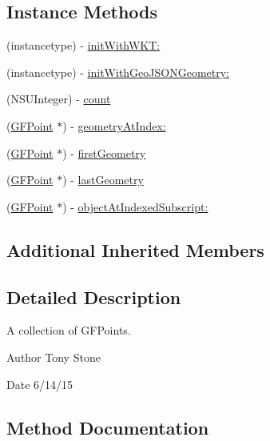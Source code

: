 \subsection*{Instance Methods}
\begin{DoxyCompactItemize}
\item 
(instancetype) -\/ \hyperlink{interface_g_f_multi_point_a003eb1cee88057991c210dd0cd63ef7f}{init\+With\+W\+K\+T\+:}
\item 
(instancetype) -\/ \hyperlink{interface_g_f_multi_point_a08bc62987b4e8c0435b00367dd617e00}{init\+With\+Geo\+J\+S\+O\+N\+Geometry\+:}
\item 
(N\+S\+U\+Integer) -\/ \hyperlink{interface_g_f_multi_point_afb692f3668a3631fbec6739c7fd7bf2c}{count}
\item 
(\hyperlink{interface_g_f_point}{G\+F\+Point} $\ast$) -\/ \hyperlink{interface_g_f_multi_point_a679f88a16cfc5e7d2d2bd1fda95303be}{geometry\+At\+Index\+:}
\item 
(\hyperlink{interface_g_f_point}{G\+F\+Point} $\ast$) -\/ \hyperlink{interface_g_f_multi_point_a2f300bc57f0010bc65da0f151b916e33}{first\+Geometry}
\item 
(\hyperlink{interface_g_f_point}{G\+F\+Point} $\ast$) -\/ \hyperlink{interface_g_f_multi_point_aa0c216ccbac49420bb8694fdb3311c6b}{last\+Geometry}
\item 
(\hyperlink{interface_g_f_point}{G\+F\+Point} $\ast$) -\/ \hyperlink{interface_g_f_multi_point_a003241a11b6d6da14364bb8a07c05a35}{object\+At\+Indexed\+Subscript\+:}
\end{DoxyCompactItemize}
\subsection*{Additional Inherited Members}


\subsection{Detailed Description}
A collection of G\+F\+Points. 

\begin{DoxyAuthor}{Author}
Tony Stone 
\end{DoxyAuthor}
\begin{DoxyDate}{Date}
6/14/15 
\end{DoxyDate}


\subsection{Method Documentation}
\hypertarget{interface_g_f_multi_point_a003eb1cee88057991c210dd0cd63ef7f}{}
